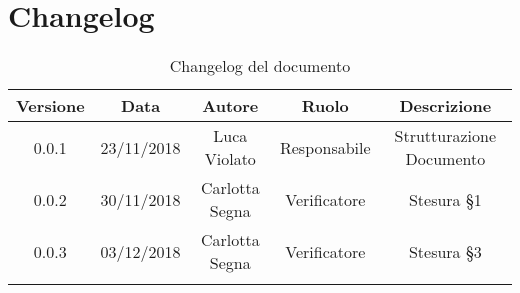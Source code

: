 \section{Changelog}

\begin{center}
\begin{longtable}{|c|c|c|c|c|}
\hline
\textbf{Versione} & \textbf{Data} & \textbf{Autore} & \textbf{Ruolo} & \textbf{Descrizione} \\
\hline \hline
\endfirsthead
0.0.1 & 23/11/2018 & Luca Violato & Responsabile & Strutturazione Documento \\
0.0.2 & 30/11/2018 & Carlotta Segna & Verificatore & Stesura §1 \\
0.0.3 & 03/12/2018 & Carlotta Segna & Verificatore & Stesura §3 \\
\hline
\caption{Changelog del documento}
\end{longtable}
\end{center}